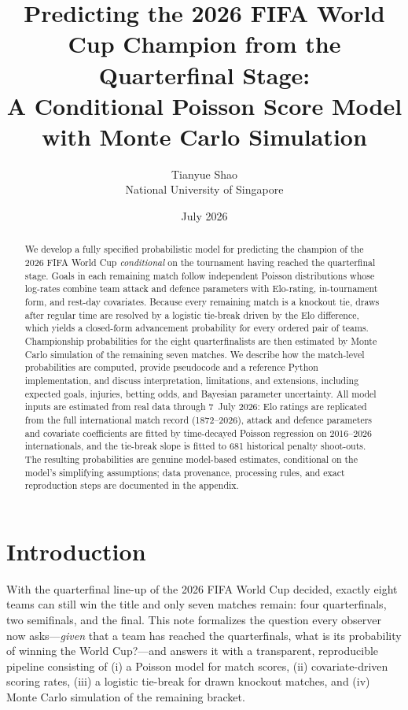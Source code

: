 \documentclass[11pt]{article}
\title{Predicting the 2026 FIFA World Cup Champion from the Quarterfinal Stage:\\
A Conditional Poisson Score Model with Monte Carlo Simulation}
\author{Tianyue Shao\\
\normalsize National University of Singapore}
\date{July 2026}
\begin{document}
\maketitle

\begin{abstract}
\noindent
We develop a fully specified probabilistic model for predicting the champion of
the 2026 FIFA World Cup \emph{conditional} on the tournament having reached the
quarterfinal stage. Goals in each remaining match follow independent Poisson
distributions whose log-rates combine team attack and defence parameters with
Elo-rating, in-tournament form, and rest-day covariates. Because every
remaining match is a knockout tie, draws after regular time are resolved by a
logistic tie-break driven by the Elo difference, which yields a closed-form
advancement probability for every ordered pair of teams. Championship
probabilities for the eight quarterfinalists are then estimated by Monte Carlo
simulation of the remaining seven matches. We describe how the match-level
probabilities are computed, provide pseudocode and a reference Python
implementation, and discuss interpretation, limitations, and extensions,
including expected goals, injuries, betting odds, and Bayesian parameter
uncertainty. All model inputs are estimated from real data through 7~July
2026: Elo ratings are replicated from the full international match record
(1872--2026), attack and defence parameters and covariate coefficients are
fitted by time-decayed Poisson regression on 2016--2026 internationals, and
the tie-break slope is fitted to 681 historical penalty shoot-outs. The
resulting probabilities are genuine model-based estimates, conditional on the
model's simplifying assumptions; data provenance, processing rules, and exact
reproduction steps are documented in the appendix.
\end{abstract}

\section{Introduction}
\label{sec:intro}

With the quarterfinal line-up of the 2026 FIFA World Cup decided, exactly eight
teams can still win the title and only seven matches remain: four
quarterfinals, two semifinals, and the final. This note formalizes the
question every observer now asks---\emph{given} that a team has reached the
quarterfinals, what is its probability of winning the World Cup?---and answers
it with a transparent, reproducible pipeline consisting of (i) a Poisson model
for match scores, (ii) covariate-driven scoring rates, (iii) a logistic
tie-break for drawn knockout matches, and (iv) Monte Carlo simulation of the
remaining bracket.
\end{document}
